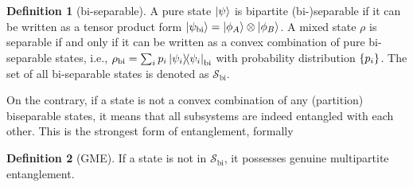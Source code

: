 \documentclass[
aps,
pra,
twocolumn,
floatfix,
]{revtex4-2}
\theoremstyle{plain}
\theoremstyle{definition}
\newtheorem{definition}{Definition}
\newcommand{\dm}{\rho}
\newcommand{\bi}{\text{bi}}
\newcommand{\separable}{\mathcal{S}}
\newcommand{\ppartition}{\mathcal{P}}
\begin{document}
\begin{definition}[bi-separable]\label{def:bipartite_separable}
	A pure state $\ket{\psi}$ is bipartite (bi-)separable if it can be written as a tensor product form 
	$\ket{\psi_{\bi}} = \ket{\phi_{A}}\otimes\ket{\phi_{B}}$. 
	A mixed state $\dm$ is separable if and only if it can be written as a convex combination of pure bi-separable states, i.e.,
	$\dm_{\bi}=\sum_i p_i \op{\psi_i}_\bi$ 
	with probability distribution $\qty{p_i}$.
	The set of all bi-separable states is denoted as $\separable_\bi$.
\end{definition}
On the contrary, if a state is not a convex combination of any (partition) biseparable states,
it means that all subsystems are indeed entangled with each other.
This is the strongest form of entanglement, 
formally
\begin{definition}[GME]\label{def:gme}
	If a state is not in $\separable_\bi$,
	it possesses genuine multipartite entanglement.
\end{definition}
\end{document}
